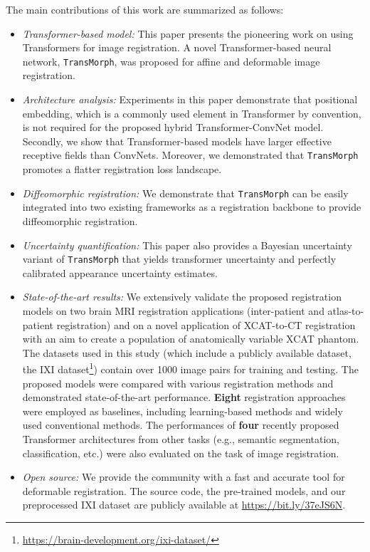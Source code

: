 \documentclass[times,twocolumn,final]{elsarticle}
\begin{document}
The main contributions of this work are summarized as follows:
\begin{itemize}[noitemsep]
    \item \textit{Transformer-based model:} This paper presents the pioneering work on using Transformers for image registration. A novel Transformer-based neural network, \texttt{TransMorph}, was proposed for affine and deformable image registration.
    \item \textit{Architecture analysis:} Experiments in this paper demonstrate that positional embedding, which is a commonly used element in Transformer by convention, is not required for the proposed hybrid Transformer-ConvNet model. Secondly, we show that Transformer-based models have larger effective receptive fields than ConvNets. Moreover, we demonstrated that \texttt{TransMorph} promotes a flatter registration loss landscape.
    \item \textit{Diffeomorphic registration:} We demonstrate that \texttt{TransMorph} can be easily integrated into two existing frameworks as a registration backbone to provide diffeomorphic registration.
    \item \textit{Uncertainty quantification:} This paper also provides a Bayesian uncertainty variant of \texttt{TransMorph} that yields transformer uncertainty and perfectly calibrated appearance uncertainty estimates.
    \item \textit{State-of-the-art results:} We extensively validate the proposed registration models on two brain MRI registration applications (inter-patient and atlas-to-patient registration) and on a novel application of XCAT-to-CT registration with an aim to create a population of anatomically variable XCAT phantom. The datasets used in this study (which include a publicly available dataset, the IXI dataset\footnote{\url{https://brain-development.org/ixi-dataset/}}) contain over 1000 image pairs for training and testing. The proposed models were compared with various registration methods and demonstrated state-of-the-art performance. \textbf{Eight} registration approaches were employed as baselines, including learning-based methods and widely used conventional methods. The performances of \textbf{four} recently proposed Transformer architectures from other tasks (e.g., semantic segmentation, classification, etc.) were also evaluated on the task of image registration.
    \item \textit{Open source:} We provide the community with a fast and accurate tool for deformable registration. The source code, the pre-trained models, and our preprocessed IXI dataset are publicly available at \url{https://bit.ly/37eJS6N}.
\end{itemize}
\end{document}
